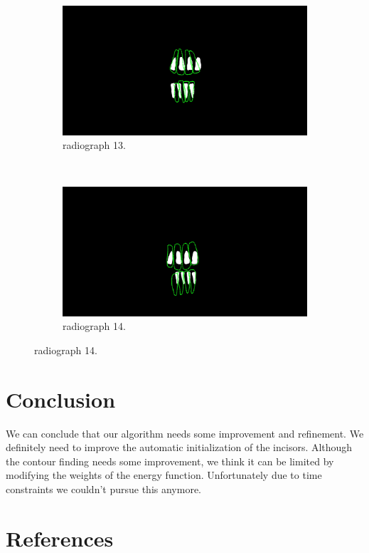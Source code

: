\documentclass[a4paper,10pt]{article}
\begin{document}
\begin{figure}
\begin{subfigure}[b]{0.45\textwidth}
                \includegraphics[width=\textwidth]{Images/segLand,13.jpg}
                \caption{ radiograph 13.}
                \label{fig:comp3}
        \end{subfigure}
        ~ %
        \begin{subfigure}[b]{0.45\textwidth}
                \includegraphics[width=\textwidth]{Images/segLand,14.jpg}
                \caption{ radiograph 14.}
                \label{fig:comp3}
        \end{subfigure}
       
\end{figure}


\section{Conclusion}
We can conclude that our algorithm needs some improvement and refinement. We definitely need to improve the automatic initialization of the incisors. Although the contour finding needs some improvement, we think it can be limited by modifying the weights of the energy function. Unfortunately due to time constraints we couldn't pursue this anymore.

\pagebreak

\section{References}


\end{document}
